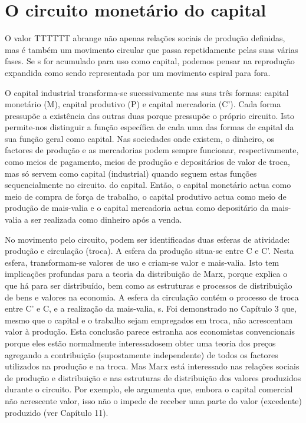\section{O circuito monetário do capital}
 \par 
O valor TTTTTT abrange não apenas relações sociais de produção definidas, mas é também um movimento circular que passa repetidamente pelas suas várias fases. Se s for acumulado para uso como capital, podemos pensar na reprodução expandida como sendo representada por um movimento espiral para fora.
 \par 
O capital industrial transforma-se sucessivamente nas suas três formas: capital monetário (M), capital produtivo (P) e capital mercadoria (C'). Cada forma pressupõe a existência das outras duas porque pressupõe o próprio circuito. Isto permite-nos distinguir a função específica de cada uma das formas de capital da sua função geral como capital. Nas sociedades onde existem, o dinheiro, os factores de produção e as mercadorias podem sempre funcionar, respectivamente, como meios de pagamento, meios de produção e depositários de valor de troca, mas só servem como capital (industrial) quando seguem estas funções sequencialmente no circuito. do capital. Então, o capital monetário actua como meio de compra de força de trabalho, o capital produtivo actua como meio de produção de mais-valia e o capital mercadoria actua como depositário da mais-valia a ser realizada como dinheiro após a venda.
 \par 
No movimento pelo circuito, podem ser identificadas duas esferas de atividade: produção e circulação (troca). A esfera da produção situa-se entre C e C'. Nesta esfera, transformam-se valores de uso e criam-se valor e mais-valia. Isto tem implicações profundas para a teoria da distribuição de Marx, porque explica o que há para ser distribuído, bem como as estruturas e processos de distribuição de bens e valores na economia. A esfera da circulação contém o processo de troca entre C' e C, e a realização da mais-valia, s. Foi demonstrado no Capítulo {\color{blue}3} que, mesmo que o capital e o trabalho sejam empregados em troca, não acrescentam valor à produção. Esta conclusão parece estranha aos economistas convencionais porque eles estão normalmente interessados ​​em obter uma teoria dos preços agregando a contribuição (supostamente independente) de todos os factores utilizados na produção e na troca. Mas Marx está interessado nas relações sociais de produção e distribuição e nas estruturas de distribuição dos valores produzidos durante o circuito. Por exemplo, ele argumenta que, embora o capital comercial não acrescente valor, isso não o impede de receber uma parte do valor (excedente) produzido (ver Capítulo {\color{blue}11}).
